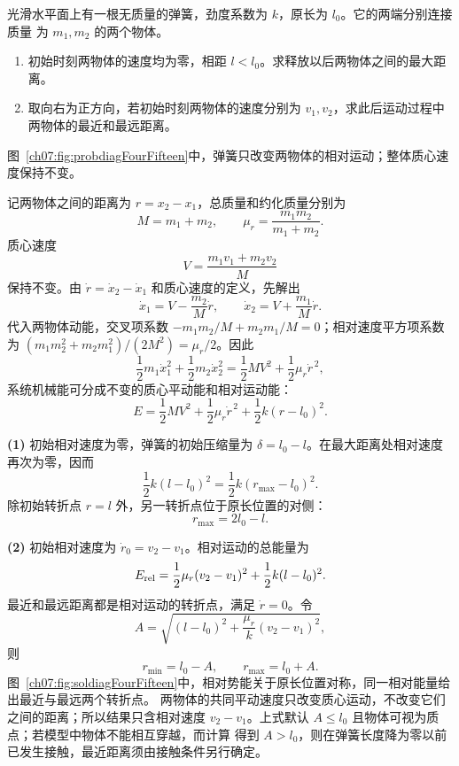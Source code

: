 {\begin{origexamplebox}{}\label{ch07:ex:s12-4-15}
光滑水平面上有一根无质量的弹簧，劲度系数为 $k$，原长为 $l_0$。它的两端分别连接质量
为 $m_1,m_2$ 的两个物体。
\begin{enumerate}[label=\arabic*.,leftmargin=2.2em]
 \item 初始时刻两物体的速度均为零，相距 $l<l_0$。求释放以后两物体之间的最大距离。
 \item 取向右为正方向，若初始时刻两物体的速度分别为 $v_1,v_2$，求此后运动过程中
 两物体的最近和最远距离。
\end{enumerate}
图~\ref{ch07:fig:probdiagFourFifteen}中，弹簧只改变两物体的相对运动；整体质心速度保持不变。
\probdiagFourFifteen
\end{origexamplebox}

\begin{xesolution}
记两物体之间的距离为 $r=x_2-x_1$，总质量和约化质量分别为
\[
 M=m_1+m_2,
 \qquad
 \mu_r=\frac{m_1m_2}{m_1+m_2}.
\]
质心速度
\[
 V=\frac{m_1v_1+m_2v_2}{M}
\]
保持不变。由 $\dot r=\dot x_2-\dot x_1$ 和质心速度的定义，先解出
\[
 \dot x_1=V-\frac{m_2}{M}\dot r,\qquad
 \dot x_2=V+\frac{m_1}{M}\dot r.
\]
代入两物体动能，交叉项系数 $-m_1m_2/M+m_2m_1/M=0$；相对速度平方项系数为
$(m_1m_2^2+m_2m_1^2)/(2M^2)=\mu_r/2$。因此
\[
 \frac12m_1\dot x_1^2+\frac12m_2\dot x_2^2
 =\frac12MV^2+\frac12\mu_r\dot r^{\,2},
\]
系统机械能可分成不变的质心平动能和相对运动能：
\[
 E=\frac12MV^2+\frac12\mu_r\dot r^{\,2}
   +\frac12k(r-l_0)^2.
\]

\textbf{(1)} 初始相对速度为零，弹簧的初始压缩量为
$\delta=l_0-l$。在最大距离处相对速度再次为零，因而
\[
 \frac12k(l-l_0)^2=\frac12k(r_{\max}-l_0)^2.
\]
除初始转折点 $r=l$ 外，另一转折点位于原长位置的对侧：
\[
 \boxed{r_{\max}=2l_0-l}.
\]

\textbf{(2)} 初始相对速度为 $\dot r_0=v_2-v_1$。相对运动的总能量为
\[
 E_{\rm rel}
 =\frac12\mu_r(v_2-v_1)^2+\frac12k(l-l_0)^2.
\]
最近和最远距离都是相对运动的转折点，满足 $\dot r=0$。令
\[
 A=\sqrt{(l-l_0)^2+\frac{\mu_r}{k}(v_2-v_1)^2},
\]
则
\[
 \boxed{r_{\min}=l_0-A},
 \qquad
 \boxed{r_{\max}=l_0+A}.
\]
图~\ref{ch07:fig:soldiagFourFifteen}中，相对势能关于原长位置对称，同一相对能量给出最近与最远两个转折点。
\soldiagFourFifteen
两物体的共同平动速度只改变质心运动，不改变它们之间的距离；所以结果只含相对速度
$v_2-v_1$。上式默认 $A\le l_0$ 且物体可视为质点；若模型中物体不能相互穿越，而计算
得到 $A>l_0$，则在弹簧长度降为零以前已发生接触，最近距离须由接触条件另行确定。
\end{xesolution}

}
